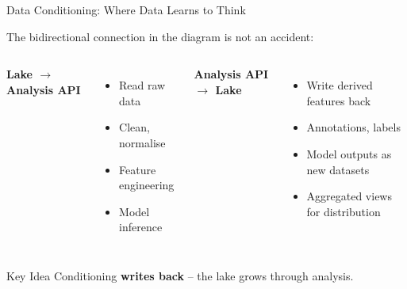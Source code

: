 \documentclass[aspectratio=169]{beamer}
\begin{document}
\begin{frame}{Data Conditioning: Where Data Learns to Think}
  \begin{center}
    The bidirectional connection in the diagram is not an accident:
  \end{center}
  \vspace{0.5em}
  \begin{columns}
      \textbf{Lake $\rightarrow$ Analysis API}
      \begin{itemize}
        \item Read raw data
        \item Clean, normalise
        \item Feature engineering
        \item Model inference
      \end{itemize}
      \textbf{Analysis API $\rightarrow$ Lake}
      \begin{itemize}
        \item Write derived features back
        \item Annotations, labels
        \item Model outputs as new datasets
        \item Aggregated views for distribution
      \end{itemize}
  \end{columns}
  \vspace{0.5em}
  \begin{exampleblock}{Key Idea}
    Conditioning \textbf{writes back} – the lake grows through analysis.
  \end{exampleblock}
\end{frame}
\end{document}
